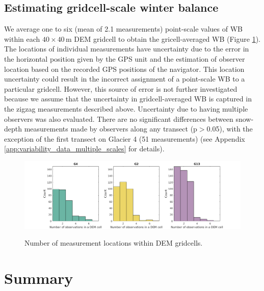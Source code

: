 \documentclass{sfuthesis}
\begin{document}
\subsection{Estimating gridcell-scale winter balance}

We average one to six (mean of 2.1 measurements) point-scale values of WB within each $40 \times 40$\,m DEM gridcell to obtain the gricell-averaged WB (Figure \ref{fig:NumObsPerCell}). The locations of individual measurements have uncertainty due to the error in the horizontal position given by the GPS unit and the estimation of observer location based on the recorded GPS positions of the navigator. This location uncertainty could result in the incorrect assignment of a point-scale WB to a particular gridcell. However, this source of error is not further investigated because we assume that the uncertainty in gridcell-averaged WB is captured in the zigzag measurements described above. Uncertainty due to having multiple observers was also evaluated. There are no significant differences between snow-depth measurements made by observers along any transect (p$>$0.05), with the exception of the first transect on Glacier 4 (51 measurements) (see Appendix \ref{app:variability_data_multiple_scales} for details). 

\begin{figure}[H]
	\centering
	\includegraphics[width =\textwidth]{NumObsPerCell.png}\\
	\caption{Number of measurement locations within DEM gridcells.}
	\label{fig:NumObsPerCell}
\end{figure}


\section{Summary}
\end{document}
